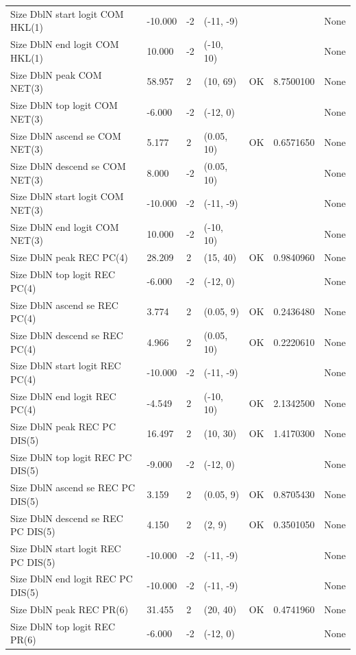 \documentclass[
  english,
  a4paper,
]{article}
\begin{document}
\begin{landscape}
\begin{longtable}[t]{lllllll}
Size DblN start logit COM HKL(1) & -10.000 & -2 & (-11, -9) &  &  & None\\
Size DblN end logit COM HKL(1) & 10.000 & -2 & (-10, 10) &  &  & None\\
Size DblN peak COM NET(3) & 58.957 & 2 & (10, 69) & OK & 8.7500100 & None\\
\addlinespace
Size DblN top logit COM NET(3) & -6.000 & -2 & (-12, 0) &  &  & None\\
Size DblN ascend se COM NET(3) & 5.177 & 2 & (0.05, 10) & OK & 0.6571650 & None\\
Size DblN descend se COM NET(3) & 8.000 & -2 & (0.05, 10) &  &  & None\\
Size DblN start logit COM NET(3) & -10.000 & -2 & (-11, -9) &  &  & None\\
Size DblN end logit COM NET(3) & 10.000 & -2 & (-10, 10) &  &  & None\\
\addlinespace
Size DblN peak REC PC(4) & 28.209 & 2 & (15, 40) & OK & 0.9840960 & None\\
Size DblN top logit REC PC(4) & -6.000 & -2 & (-12, 0) &  &  & None\\
Size DblN ascend se REC PC(4) & 3.774 & 2 & (0.05, 9) & OK & 0.2436480 & None\\
Size DblN descend se REC PC(4) & 4.966 & 2 & (0.05, 10) & OK & 0.2220610 & None\\
Size DblN start logit REC PC(4) & -10.000 & -2 & (-11, -9) &  &  & None\\
\addlinespace
Size DblN end logit REC PC(4) & -4.549 & 2 & (-10, 10) & OK & 2.1342500 & None\\
Size DblN peak REC PC DIS(5) & 16.497 & 2 & (10, 30) & OK & 1.4170300 & None\\
Size DblN top logit REC PC DIS(5) & -9.000 & -2 & (-12, 0) &  &  & None\\
Size DblN ascend se REC PC DIS(5) & 3.159 & 2 & (0.05, 9) & OK & 0.8705430 & None\\
Size DblN descend se REC PC DIS(5) & 4.150 & 2 & (2, 9) & OK & 0.3501050 & None\\
\addlinespace
Size DblN start logit REC PC DIS(5) & -10.000 & -2 & (-11, -9) &  &  & None\\
Size DblN end logit REC PC DIS(5) & -10.000 & -2 & (-11, -9) &  &  & None\\
Size DblN peak REC PR(6) & 31.455 & 2 & (20, 40) & OK & 0.4741960 & None\\
Size DblN top logit REC PR(6) & -6.000 & -2 & (-12, 0) &  &  & None\\

\end{longtable}
\end{landscape}
\end{document}
